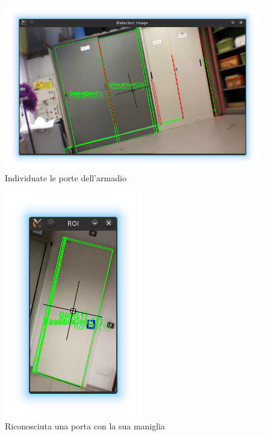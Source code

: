 \begin{figure}[ht]
  \includegraphics[width=\textwidth]{immagini/risultati/detection}
  \caption[Individuazione degli oggetti]{Individuate le porte dell'armadio}
  \label{fig:detection}
\end{figure}


\begin{figure}[ht]
  \includegraphics{immagini/risultati/recognition1}
  \caption[Riconoscimento della porta]{Riconosciuta una porta con la sua maniglia}
  \label{fig:recognition1}
\end{figure}

